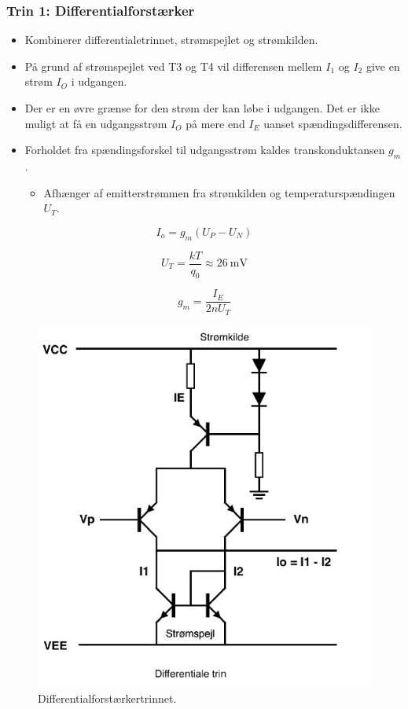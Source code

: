 \documentclass[danish]{article}
\begin{document}
\subsubsection{Trin 1: Differentialforstærker}
\begin{itemize}
	\item Kombinerer differentialetrinnet, strømspejlet og strømkilden.
	\item På grund af strømspejlet ved T3 og T4 vil differensen mellem $I_1$ og $I_2$ give en strøm $I_O$ i udgangen.
	\item Der er en øvre grænse for den strøm der kan løbe i udgangen. Det er ikke muligt at få en udgangsstrøm $I_O$ på mere end $I_E$ uanset spændingsdifferensen.
	\item Forholdet fra spændingsforskel til udgangsstrøm kaldes transkonduktansen $g_m$.
	\begin{itemize}
		\item Afhænger af emitterstrømmen fra strømkilden og temperaturspændingen $U_T$.
	\end{itemize} 
\end{itemize}

\begin{equation} 
I_o = g_m(U_P-U_N)
\end{equation}

\begin{equation} 
U_T = \frac{k T}{q_0} \approx \SI{26}{\milli\volt}
\end{equation}

\begin{equation} 
g_m = \frac{I_E}{2nU_T}
\end{equation}

\begin{figure} [H]
	\centering
	\includegraphics[width=0.7\linewidth]{graphics/differentialtrin_fors}
	\caption{Differentialforstærkertrinnet.}
	\label{fig:differentialforstærker}
\end{figure}
\end{document}
